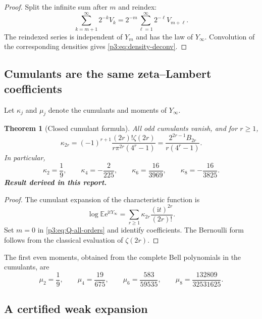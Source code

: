 \documentclass[11pt,oneside]{article}
\numberwithin{equation}{section}
\newtheorem{theorem}{Theorem}[section]
\theoremstyle{definition}
\theoremstyle{remark}
\newcommand{\E}{\mathbb E}
\newcommand{\e}{\mathrm e}
\newcommand{\ii}{\mathrm i}
\newcommand{\newresult}{\textbf{Result derived in this report.}}
\begin{document}
\begin{proof}
Split the infinite sum after $m$ and reindex:
\[
 \sum_{k=m+1}^{\infty}2^{-k}V_k
 =2^{-m}\sum_{\ell=1}^{\infty}2^{-\ell}V_{m+\ell}.
\]
The reindexed series is independent of $Y_m$ and has the law of $Y_\infty$.  Convolution of
the corresponding densities gives \eqref{p3:eq:density-deconv}.
\end{proof}

\subsection{Cumulants are the same zeta--Lambert coefficients}

Let $\kappa_j$ and $\mu_j$ denote the cumulants and moments of $Y_\infty$.

\begin{theorem}[Closed cumulant formula]
\label{p3:thm:cumulants}
All odd cumulants vanish, and for $r\ge1$,
\begin{equation}
 \boxed{
 \kappa_{2r}
 =(-1)^{r+1}\frac{(2r)!\zeta(2r)}{r\pi^{2r}(4^r-1)}
 =\frac{2^{2r-1}B_{2r}}{r(4^r-1)}.}
 \label{p3:eq:cumulants}
\end{equation}
In particular,
\begin{equation}
 \kappa_2=\frac19,\qquad
 \kappa_4=-\frac2{225},\qquad
 \kappa_6=\frac{16}{3969},\qquad
 \kappa_8=-\frac{16}{3825}.
 \label{p3:eq:cumulants-first}
\end{equation}
\newresult
\end{theorem}

\begin{proof}
The cumulant expansion of the characteristic function is
\[
 \log\E\e^{\ii tY_\infty}
 =\sum_{r\ge1}\kappa_{2r}\frac{(\ii t)^{2r}}{(2r)!}.
\]
Set $m=0$ in \eqref{p3:eq:Q-all-orders} and identify coefficients.  The Bernoulli form follows
from the classical evaluation of $\zeta(2r)$.
\end{proof}

The first even moments, obtained from the complete Bell polynomials in the cumulants, are
\begin{equation}
 \mu_2=\frac19,\qquad
 \mu_4=\frac{19}{675},\qquad
 \mu_6=\frac{583}{59535},\qquad
 \mu_8=\frac{132809}{32531625}.
 \label{p3:eq:moments-first}
\end{equation}

\subsection{A certified weak expansion}
\end{document}
